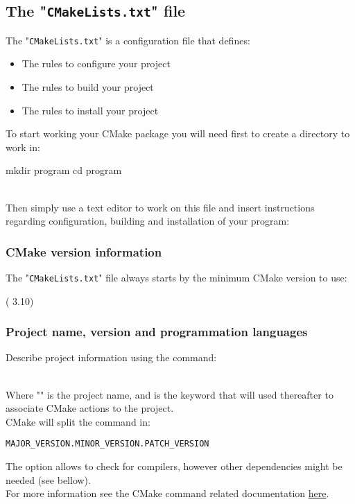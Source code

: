 \subsection{The "\texttt{CMakeLists.txt}" file} 

The "\texttt{CMakeLists.txt}" is a configuration file that defines:  
\begin{itemize}
\item The rules to configure your project
\item The rules to build your project
\item The rules to install your project
\end{itemize}
To start working your CMake package you will need first to create a directory to work in:
\begin{script}
\fprompt{~} mkdir program
\fprompt{~} cd program
\end{script}
\\[-0.25cm]
\noindent Then simply use a text editor to work on this file and insert instructions regarding configuration, building and installation of your program:
\begin{script}
\fprompt{~}  
\end{script}

\subsubsection*{CMake version information}

The "\texttt{CMakeLists.txt}" file always starts by the minimum CMake version to use: 
\begin{script}
 ( 3.10)
\end{script}

\subsubsection*{Project name, version and programmation languages}
\label{cmake_pname}

Describe project information using the  command:
\begin{script}
\end{script}
\\[-0.25cm]
\noindent Where "" is the project name, and is the keyword that will used thereafter to associate CMake actions to the project. \\ 
CMake will split the  command in:
\begin{center}\texttt{MAJOR\_VERSION.MINOR\_VERSION.PATCH\_VERSION} \end{center}
The  option allows to check for compilers, however other dependencies might be needed (see bellow). \\[0.25cm]
For more information see the CMake  command related documentation \href{https://cmake.org/cmake/help/latest/command/project.html\#command:project}{here}.

